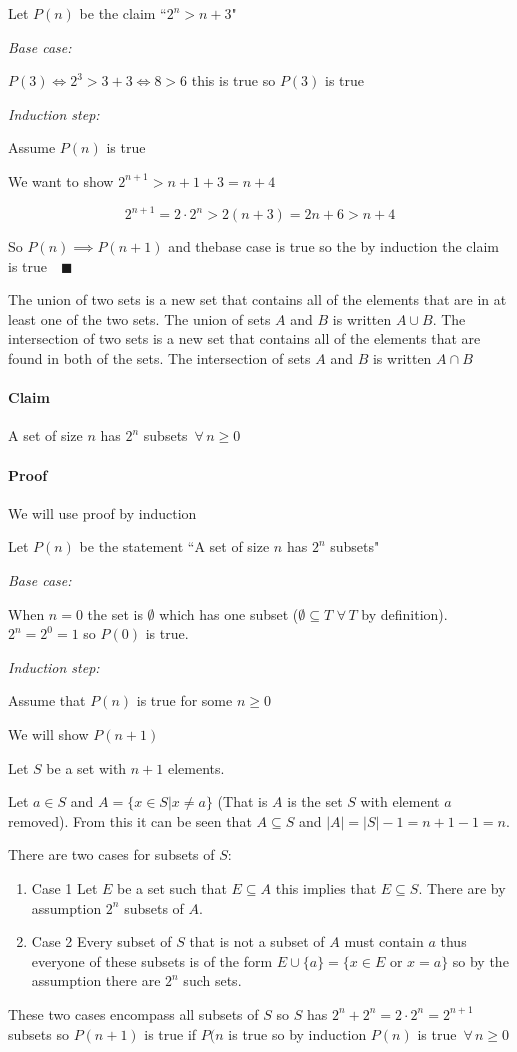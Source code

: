 \documentclass{article}
\newcommand{\A}{\,\forall\,}
\begin{document}
Let \(P(n)\) be the claim ``\(2^n>n+3\)"
 
\emph{Base case:}

\(P(3)\iff2^3>3+3\iff8>6\) this is true so \(P(3)\) is true

\emph{Induction step:}

Assume \(P(n)\) is true

We want to show \(2^{n+1}>n+1+3=n+4\)

\[2^{n+1}=2\cdot2^n>2(n+3)=2n+6>n+4\]

So \(P(n)\implies P(n+1)\) and thebase case is true so the by induction the claim is true\(\quad\blacksquare\)

The union of two sets is a new set that contains all of the elements that are in at least one of the two sets. The union of sets \(A\) and \(B\) is written \(A\cup B\). The intersection of two sets is a new set that contains all of the elements that are found in both of the sets. The intersection of sets \(A\) and \(B\) is written \(A\cap B\)

\paragraph{Claim} A set of size \(n\) has \(2^n\) subsets \(\A n\ge0\)

\paragraph{Proof} We will use proof by induction

Let \(P(n)\) be the statement ``A set of size \(n\) has \(2^n\) subsets"

\emph{Base case:}

When \(n=0\) the set is \(\emptyset\) which has one subset (\(\emptyset\subseteq T\,\A T\) by definition). \(2^n=2^0=1\) so \(P(0)\) is true.

\emph{Induction step:}

Assume that \(P(n)\) is true for some \(n\ge0\)

We will show \(P(n+1)\)

Let \(S\) be a set with \(n+1\) elements.

Let \(a\in S\) and \(A=\{x\in S|x\ne a\}\) (That is \(A\) is the set \(S\) with element \(a\) removed). From this it can be seen that \(A\subseteq S\) and \(|A|=|S|-1=n+1-1=n\).

There are two cases for subsets of \(S\):
\begin{enumerate}
\item Case 1 Let \(E\) be a set such that \(E\subseteq A\) this implies that \(E\subseteq S\). There are by assumption \(2^n\) subsets of \(A\).
\item Case 2 Every subset of \(S\) that is not a subset of \(A\) must contain \(a\) thus everyone of these subsets is of the form \(E\cup\{a\}=\{x\in E\text{ or }x=a\}\) so by the assumption there are \(2^n\) such sets.
\end{enumerate}
These two cases encompass all subsets of \(S\) so \(S\) has \(2^n+2^n=2\cdot 2^n=2^{n+1}\) subsets so \(P(n+1)\) is true if \(P(n\) is true so by induction \(P(n)\) is true \(\A n\ge0\)
\end{document}
